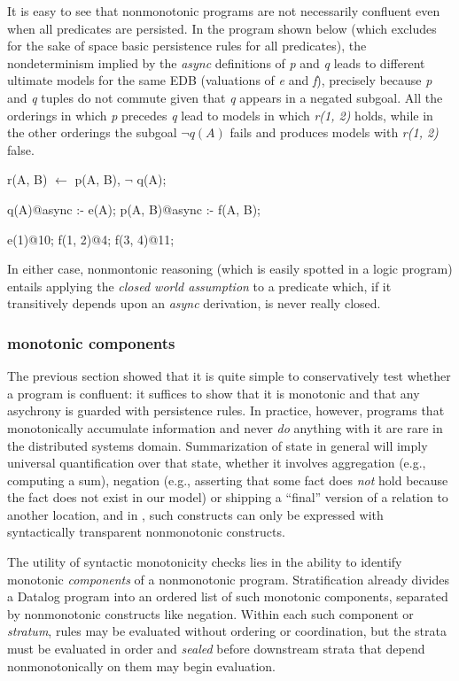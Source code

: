 It is easy to see that nonmonotonic programs are not necessarily confluent even when all
predicates are persisted.  In the program shown below (which excludes for the sake of space 
basic persistence rules for all predicates), the nondeterminism implied by the {\em async}
definitions of {\em p} and {\em q} leads to different ultimate models for the same EDB
(valuations of {\em e} and {\em f}), precisely because {\em p} and {\em q} tuples do not
commute given that {\em q} appears in a negated subgoal.  All the orderings in which {\em p}
precedes {\em q} lead to models in which {\em r(1, 2)} holds, while in the other orderings the subgoal
$\lnot q(A)$ fails and produces models with {\em r(1, 2)} false.

\begin{Dedalus}
r(A, B) \(\leftarrow\) 
    p(A, B), \(\lnot\) q(A);

q(A)@async :- e(A);
p(A, B)@async :- f(A, B);

e(1)@10;
f(1, 2)@4;
f(3, 4)@11; 
\end{Dedalus} 

In either case, nonmontonic reasoning (which is easily spotted in a logic program)
entails applying the \emph{closed world assumption} to a predicate which, if it transitively 
depends upon an {\em async} derivation, is never really closed.

\subsubsection{monotonic components}


The previous section showed that it is quite simple to conservatively test whether a program
is confluent: it suffices to show that it is monotonic and that any asychrony is guarded with
persistence rules.
In practice, however, programs that monotonically accumulate information and never \emph{do} 
anything with it are rare in the distributed systems domain.  Summarization of state in 
general will imply universal quantification over that state, whether it involves aggregation (e.g., computing a sum), negation (e.g., asserting that some fact does \emph{not} hold because 
the fact does not exist in our model) or shipping a ``final'' version of a relation to another 
location, and in \lang, such constructs can only be expressed with syntactically transparent
nonmonotonic constructs.  

The utility of syntactic monotonicity checks lies in the ability to identify monotonic 
\emph{components} of a nonmonotonic program.  Stratification already divides
a Datalog program into an ordered list of such monotonic components, separated by 
nonmonotonic constructs like negation.  Within each such component or \emph{stratum}, rules
may be evaluated without ordering or coordination, but the strata must be evaluated in order and 
\emph{sealed} before downstream strata that depend nonmonotonically on them may 
begin evaluation.  


